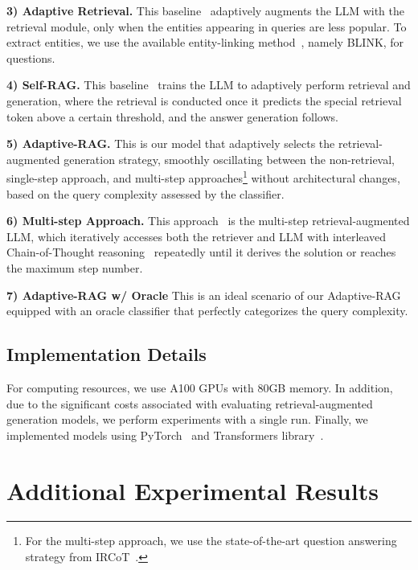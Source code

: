 \noindent
\textbf{3) Adaptive Retrieval.} This baseline~\cite{adaptiveRetrieval} adaptively augments the LLM with the retrieval module, only when the entities appearing in queries are less popular. To extract entities, we use the available entity-linking method~\cite{blinke}, namely BLINK, for questions.

\noindent
\textbf{4) Self-RAG.} This baseline~\cite{self-rag} trains the LLM to adaptively perform retrieval and generation, where the retrieval is conducted once it predicts the special retrieval token above a certain threshold, and the answer generation follows.

\noindent
\textbf{5) Adaptive-RAG.} This is our model that adaptively selects the retrieval-augmented generation strategy, smoothly oscillating between the non-retrieval, single-step approach, and multi-step approaches\footnote{For the multi-step approach, we use the state-of-the-art question answering strategy from IRCoT~\cite{ircot}.} without architectural changes, based on the query complexity assessed by the classifier. 

\noindent
\textbf{6) Multi-step Approach.} This approach~\cite{ircot} is the multi-step retrieval-augmented LLM, which iteratively accesses both the retriever and LLM with interleaved Chain-of-Thought reasoning~\cite{cot} repeatedly until it derives the solution or reaches the maximum step number.

\noindent
\textbf{7) Adaptive-RAG w/ Oracle} This is an ideal scenario of our Adaptive-RAG equipped with an oracle classifier that perfectly categorizes the query complexity. 


\subsection{Implementation Details}
For computing resources, we use A100 GPUs with 80GB memory. In addition, due to the significant costs associated with evaluating retrieval-augmented generation models, we perform experiments with a single run. Finally, we implemented models using PyTorch~\cite{DBLP:conf/nips/PaszkeGMLBCKLGA19} and Transformers library~\cite{DBLP:conf/emnlp/WolfDSCDMCRLFDS20}.

\section{Additional Experimental Results}






